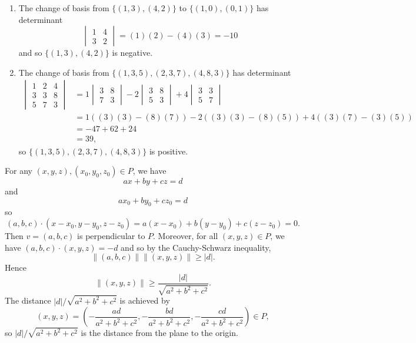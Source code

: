 \begin{ex}
\begin{enumerate}
\item The change of basis from $\{(1, 3), (4, 2)\}$ to $\{(1, 0), (0, 1)\}$ has determinant \[\begin{vmatrix}
1 & 4\\
3 & 2
\end{vmatrix} = (1)(2) - (4)(3) = -10\] and so $\{(1, 3), (4, 2)\}$ is negative.

\item The change of basis from $\{(1, 3, 5), (2, 3, 7), (4, 8, 3)\}$ has determinant
\begin{align*}
\begin{vmatrix}
1 & 2 & 4\\
3 & 3 & 8\\
5 & 7 & 3
\end{vmatrix} & = 1\begin{vmatrix}
3 & 8\\
7 & 3
\end{vmatrix} - 2\begin{vmatrix}
3 & 8\\
5 & 3
\end{vmatrix} + 4\begin{vmatrix}
3 & 3\\
5 & 7
\end{vmatrix}\\
& = 1((3)(3) - (8)(7)) - 2((3)(3) - (8)(5)) + 4((3)(7) - (3)(5))\\
& = -47 + 62 + 24\\
& = 39,
\end{align*}
so $\{(1, 3, 5), (2, 3, 7), (4, 8, 3)\}$ is positive.
\end{enumerate}
\end{ex}

\begin{ex}
For any $(x, y, z), (x_0, y_0, z_0) \in P$, we have \[ax + by + cz = d\] and \[ax_0 + by_0 + cz_0 = d\] so \[(a, b, c)\cdot(x-x_0, y-y_0, z-z_0) = a(x-x_0) + b(y-y_0) + c(z-z_0) = 0.\] Then $v = (a, b, c)$ is perpendicular to $P$. Moreover, for all $(x, y, z) \in P$, we have $(a, b, c)\cdot(x, y, z) = -d$ and so by the Cauchy-Schwarz inequality, \[\|(a, b, c)\|\|(x, y, z)\| \geq |d|.\] Hence \[\|(x, y, z)\| \geq \frac{|d|}{\sqrt{a^2 + b^2 + c^2}}.\] The distance $|d|/\sqrt{a^2 + b^2 + c^2}$ is achieved by \[(x, y, z) = \left(-\frac{ad}{a^2+b^2+c^2}, -\frac{bd}{a^2+b^2+c^2}, -\frac{cd}{a^2+b^2+c^2}\right) \in P,\] so $|d|/\sqrt{a^2+b^2+c^2}$ is the distance from the plane to the origin.
\end{ex}

